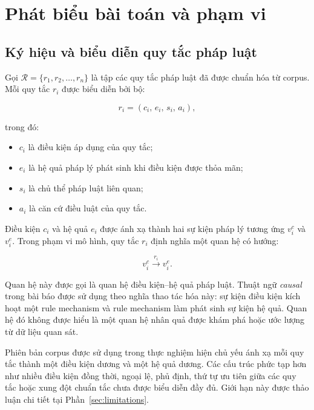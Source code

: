 \section{Phát biểu bài toán và phạm vi}
\label{sec:problem}

\subsection{Ký hiệu và biểu diễn quy tắc pháp luật}

Gọi \(\mathcal{R}=\{r_1,r_2,\ldots,r_n\}\) là tập các quy tắc pháp luật đã
được chuẩn hóa từ corpus. Mỗi quy tắc \(r_i\) được biểu diễn bởi bộ:

\begin{equation}
r_i =
\left(
    c_i,\,
    e_i,\,
    s_i,\,
    a_i
\right),
\label{eq:rule}
\end{equation}

trong đó:

\begin{itemize}
    \item \(c_i\) là điều kiện áp dụng của quy tắc;
    \item \(e_i\) là hệ quả pháp lý phát sinh khi điều kiện được thỏa mãn;
    \item \(s_i\) là chủ thể pháp luật liên quan;
    \item \(a_i\) là căn cứ điều luật của quy tắc.
\end{itemize}

Điều kiện \(c_i\) và hệ quả \(e_i\) được ánh xạ thành hai sự kiện pháp lý
tương ứng \(v_i^{c}\) và \(v_i^{e}\). Trong phạm vi mô hình, quy tắc \(r_i\)
định nghĩa một quan hệ có hướng:

\begin{equation}
v_i^{c}
\xrightarrow{r_i}
v_i^{e}.
\end{equation}

Quan hệ này được gọi là quan hệ điều kiện--hệ quả pháp luật. Thuật ngữ
\emph{causal} trong bài báo được sử dụng theo nghĩa thao tác hóa này: sự
kiện điều kiện kích hoạt một rule mechanism và rule mechanism làm phát sinh
sự kiện hệ quả. Quan hệ đó không được hiểu là một quan hệ nhân quả được
khám phá hoặc ước lượng từ dữ liệu quan sát.

Phiên bản corpus được sử dụng trong thực nghiệm hiện chủ yếu ánh xạ mỗi quy
tắc thành một điều kiện dương và một hệ quả dương. Các cấu trúc phức tạp hơn
như nhiều điều kiện đồng thời, ngoại lệ, phủ định, thứ tự ưu tiên giữa các
quy tắc hoặc xung đột chuẩn tắc chưa được biểu diễn đầy đủ. Giới hạn này
được thảo luận chi tiết tại Phần~\ref{sec:limitations}.

